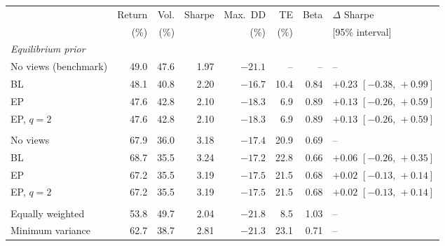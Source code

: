 \begin{tabular}{lrrrrrrl}
\toprule
 & Return & Vol. & Sharpe & Max.\ DD & TE & Beta & $\Delta$ Sharpe \\
 & (\%) & (\%) & & (\%) & (\%) & & [95\% interval] \\
\midrule
\multicolumn{8}{l}{\emph{Equilibrium prior}} \\
\quad No views (benchmark) & 49.0 & 47.6 & 1.97 & $-21.1$ & -- & -- & -- \\
\quad BL & 48.1 & 40.8 & 2.20 & $-16.7$ & 10.4 & 0.84 & $+0.23$ $[-0.38,\, +0.99]$ \\
\quad EP & 47.6 & 42.8 & 2.10 & $-18.3$ & 6.9 & 0.89 & $+0.13$ $[-0.26,\, +0.59]$ \\
\quad EP, $q=2$ & 47.6 & 42.8 & 2.10 & $-18.3$ & 6.9 & 0.89 & $+0.13$ $[-0.26,\, +0.59]$ \\
\addlinespace
\multicolumn{8}{l}{\emph{Historical prior}} \\
\quad No views & 67.9 & 36.0 & 3.18 & $-17.4$ & 20.9 & 0.69 & -- \\
\quad BL & 68.7 & 35.5 & 3.24 & $-17.2$ & 22.8 & 0.66 & $+0.06$ $[-0.26,\, +0.35]$ \\
\quad EP & 67.2 & 35.5 & 3.19 & $-17.5$ & 21.5 & 0.68 & $+0.02$ $[-0.13,\, +0.14]$ \\
\quad EP, $q=2$ & 67.2 & 35.5 & 3.19 & $-17.5$ & 21.5 & 0.68 & $+0.02$ $[-0.13,\, +0.14]$ \\
\addlinespace
\multicolumn{8}{l}{\emph{Reference portfolios}} \\
\quad Equally weighted & 53.8 & 49.7 & 2.04 & $-21.8$ & 8.5 & 1.03 & -- \\
\quad Minimum variance & 62.7 & 38.7 & 2.81 & $-21.3$ & 23.1 & 0.71 & -- \\
\bottomrule
\end{tabular}
